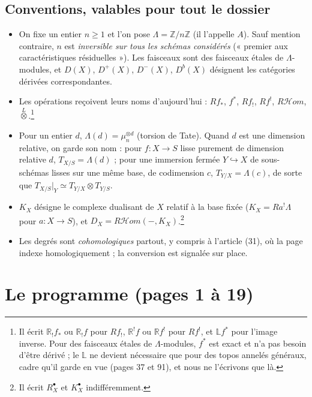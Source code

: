 \documentclass[11pt,a4paper]{article}
\begin{document}
\subsection*{Conventions, valables pour tout le dossier}

\begin{itemize}
\item On fixe un entier $n \geq 1$ et l'on pose $\Lambda = \mathbb{Z}/n\mathbb{Z}$
(il l'appelle $A$). Sauf mention contraire, $n$ est \emph{inversible sur tous
les schémas considérés} (« premier aux caractéristiques résiduelles »). Les
faisceaux sont des faisceaux étales de $\Lambda$-modules, et $D(X)$,
$D^{+}(X)$, $D^{-}(X)$, $D^{b}(X)$ désignent les catégories dérivées
correspondantes.
\item Les opérations reçoivent leurs noms d'aujourd'hui : $Rf_{*}$, $f^{*}$,
$Rf_{!}$, $Rf^{!}$, $R\mathcal{H}om$, $\overset{L}{\otimes}$.\footnote{Il écrit
$\mathbb{R}_{!}f_{*}$ ou $\mathbb{R}_{!}f$ pour $Rf_{!}$, $\mathbb{R}^{!}f$ ou
$\mathbb{R}f^{!}$ pour $Rf^{!}$, et $\mathbb{L}f^{*}$ pour l'image inverse.
Pour des faisceaux étales de $\Lambda$-modules, $f^{*}$ est exact et n'a pas
besoin d'être dérivé ; le $\mathbb{L}$ ne devient nécessaire que pour des
topos annelés généraux, cadre qu'il garde en vue (pages 37 et 91), et nous ne
l'écrivons que là.}
\item Pour un entier $d$, $\Lambda(d) = \mu_{n}^{\otimes d}$ (torsion de Tate).
Quand $d$ est une dimension relative, on garde son nom : pour $f : X \to S$
lisse purement de dimension relative $d$, $T_{X/S} = \Lambda(d)$ ; pour une
immersion fermée $Y \hookrightarrow X$ de sous-schémas lisses sur une même base,
de codimension $c$, $T_{Y/X} = \Lambda(c)$, de sorte que
$T_{X/S}|_{Y} \simeq T_{Y/X} \otimes T_{Y/S}$.
\item $K_{X}$ désigne le complexe dualisant de $X$ relatif à la base fixée
($K_{X} = Ra^{!}\Lambda$ pour $a : X \to S$), et $D_{X} = R\mathcal{H}om(-,
K_{X})$.\footnote{Il écrit $R^{\bullet}_{X}$ et $K^{\bullet}_{X}$
indifféremment.}
\item Les degrés sont \emph{cohomologiques} partout, y compris à
l'article (31), où la page indexe homologiquement ; la conversion est
signalée sur place.
\end{itemize}

\section*{Le programme (pages 1 à 19)}
\end{document}

